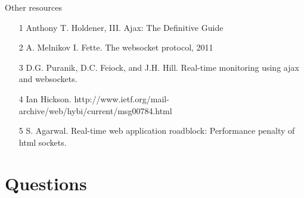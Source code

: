 \documentclass{soa.cs.pub.ro}
\begin{document}
\begin{frame}{Other resources}
  \begin{itemize}
    \item [1] Anthony T. Holdener, III. Ajax: The Definitive Guide
    \item [2] A. Melnikov I. Fette. The websocket protocol, 2011
    \item [3] D.G. Puranik, D.C. Feiock, and J.H. Hill. Real-time
              monitoring using ajax and websockets.
    \item [4] Ian Hickson.
      http://www.ietf.org/mail-archive/web/hybi/current/msg00784.html
    \item [5] S. Agarwal. Real-time web application roadblock: Performance
      penalty of html sockets.
  \end{itemize}
\end{frame}

\section{Questions}
\end{document}

